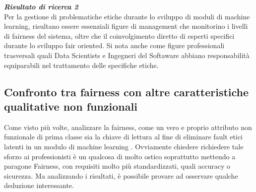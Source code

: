 	 
	 \begin{center}
	
        \begin{tcolorbox}[width=\textwidth, colframe=black, colback=Gray]
    			\begin{minipage}{\textwidth}
    				\textit{\faKey  \textbf{ Risultato di ricerca 2}}\\
    			 Per la gestione di problematiche etiche durante lo sviluppo di moduli di machine learning, risultano essere essenziali figure di management che monitorino i livelli di fairness del sistema, oltre che il coinvolgimento diretto di esperti specifici durante lo sviluppo fair oriented. Si nota anche come figure professionali trasversali quali Data Scientists e Ingegneri del Softaware abbiano responsabilità equiparabili nel trattamento delle specifiche etiche.
    			\end{minipage}
		\end{tcolorbox}
	\end{center}
	
	
    \subsection{Confronto tra fairness con altre caratteristiche qualitative non funzionali}
    
    \begin{center}
		\hspace*{-5mm}%
	\end{center}
	Come visto più volte, analizzare la fairness, come un vero e proprio attributo non funzionale di prima classe sia la chiave di lettura al fine di eliminare fault etici latenti in un modulo di machine learning \cite{brun2018software}. Ovviamente chiedere richiedere tale sforzo ai professionisti è un qualcosa di molto ostico soprattutto mettendo a paragone Fairness, con requisiti molto più standardizzati, quali accuracy o sicurezza. Ma analizzando i risultati, è possibile provare ad osservare qualche deduzione interessante.\\
	
